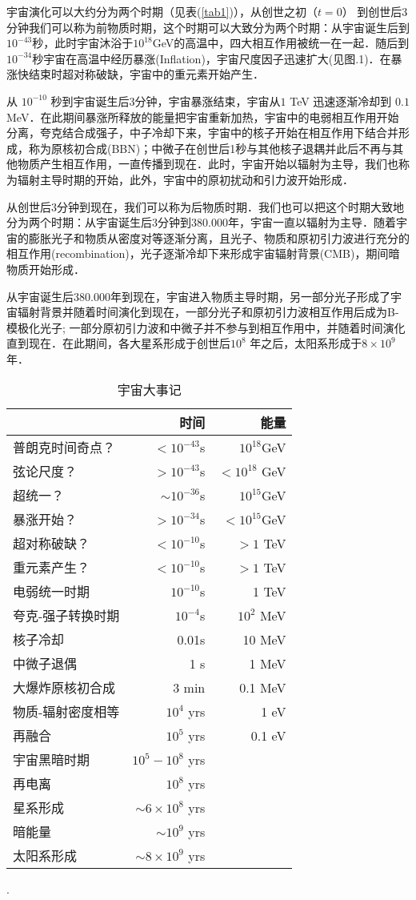 宇宙演化可以大约分为两个时期（见表(\ref{tab1})），从创世之初（$t=0$） 到创世后3分钟我们可以称为前物质时期，这个时期可以大致分为两个时期：从宇宙诞生后到$10^{-43}$秒，此时宇宙沐浴于$10^{18}$GeV的高温中，四大相互作用被统一在一起．随后到$10^{-34}$秒宇宙在高温中经历暴涨(Inflation)，宇宙尺度因子迅速扩大(见图.1)．在暴涨快结束时超对称破缺，宇宙中的重元素开始产生．

从
$10^{-10}$ 秒到宇宙诞生后3分钟，宇宙暴涨结束，宇宙从$1$ TeV 迅速逐渐冷却到 $0.1 $ MeV．在此期间暴涨所释放的能量把宇宙重新加热，宇宙中的电弱相互作用开始分离，夸克结合成强子，中子冷却下来，宇宙中的核子开始在相互作用下结合并形成，称为原核初合成(BBN)；中微子在创世后1秒与其他核子退耦并此后不再与其他物质产生相互作用，一直传播到现在．此时，宇宙开始以辐射为主导，我们也称为辐射主导时期的开始，此外，宇宙中的原初扰动和引力波开始形成．

从创世后3分钟到现在，我们可以称为后物质时期．我们也可以把这个时期大致地分为两个时期：从宇宙诞生后3分钟到380.000年，宇宙一直以辐射为主导．随着宇宙的膨胀光子和物质从密度对等逐渐分离，且光子、物质和原初引力波进行充分的相互作用(recombination)，光子逐渐冷却下来形成宇宙辐射背景(CMB)，期间暗物质开始形成．

从宇宙诞生后380.000年到现在，宇宙进入物质主导时期，另一部分光子形成了宇宙辐射背景并随着时间演化到现在，一部分光子和原初引力波相互作用后成为B-模极化光子; 一部分原初引力波和中微子并不参与到相互作用中，并随着时间演化直到现在．在此期间，各大星系形成于创世后$10^8$ 年之后，太阳系形成于$8\times 10^9$年．
\begin{table}[htbp]
\begin{tabular}{l|r|r}
 & 时间 & 能量 \\
\hline
\hline
普朗克时间奇点？ & $<10^{-43}$s & $10^{18}${\rm GeV} \\
弦论尺度？       & $>10^{-43}$s & $<10^{18}$ GeV \\
超统一？         & $\sim 10^{-36}$s & $10^{15}$GeV \\
暴涨开始？       & $>10^{-34}$s & $<10^{15} $GeV \\
超对称破缺？     & $<10^{-10}$s & $>1$ TeV \\
重元素产生？     & $<10^{-10}$s & $>1$ TeV \\
\hline
\hline
电弱统一时期    & $10^{-10}$s & 1 TeV \\
夸克-强子转换时期 & $10^{-4}$s & $10^2$ MeV \\
核子冷却        & 0.01s & 10 MeV \\
中微子退偶      & 1 s  & 1 MeV \\
大爆炸原核初合成  & 3 min & 0.1 MeV \\
\hline
\hline
物质-辐射密度相等 & $10^4$ yrs  & 1 eV \\
再融合 & $10^5$ yrs  & 0.1 eV \\
宇宙黑暗时期 & $10^5 - 10^8$ yrs  &  \\
再电离 & $10^8$ yrs  &  \\
星系形成 & $\sim 6 \times 10^8$ yrs  &  \\
暗能量 & $\sim 10^9$  yrs  &  \\
太阳系形成 & $ \sim 8 \times 10^9  $ yrs  &  \\
\hline
\end{tabular}.
\caption{宇宙大事记}
\end{table}
